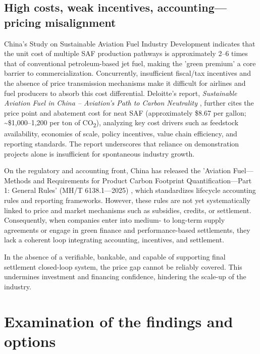 \documentclass[a4paper,11pt]{article}
\begin{document}
\subsection{High costs, weak incentives, accounting---pricing misalignment}
China's Study on Sustainable Aviation Fuel Industry Development \cite{tian2025} indicates that the unit cost of multiple SAF production pathways is approximately 2--6 times that of conventional petroleum-based jet fuel, making the 'green premium' a core barrier to commercialization. Concurrently, insufficient fiscal/tax incentives and the absence of price transmission mechanisms make it difficult for airlines and fuel producers to absorb this cost differential. Deloitte's report, \textit{Sustainable Aviation Fuel in China -- Aviation's Path to Carbon Neutrality} \cite{deloitte2023}, further cites the price point and abatement cost for neat SAF (approximately \$8.67 per gallon; \textasciitilde\$1,000--1,200 per ton of CO\textsubscript{2}), analyzing key cost drivers such as feedstock availability, economies of scale, policy incentives, value chain efficiency, and reporting standards. The report underscores that reliance on demonstration projects alone is insufficient for spontaneous industry growth.

On the regulatory and accounting front, China has released the 'Aviation Fuel---Methods and Requirements for Product Carbon Footprint Quantification---Part 1: General Rules' (MH/T 6138.1---2025) \cite{caac2025}, which standardizes lifecycle accounting rules and reporting frameworks. However, these rules are not yet systematically linked to price and market mechanisms such as subsidies, credits, or settlement. Consequently, when companies enter into medium- to long-term supply agreements or engage in green finance and performance-based settlements, they lack a coherent loop integrating accounting, incentives, and settlement.

In the absence of a verifiable, bankable, and capable of supporting final settlement closed-loop system, the price gap cannot be reliably covered. This undermines investment and financing confidence, hindering the scale-up of the industry.


\section{Examination of the findings and options}
\end{document}
